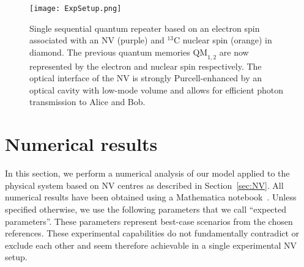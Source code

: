 \documentclass[aps,pra,reprint,superscriptaddress]{revtex4-1}
\begin{document}
\begin{figure}
	\centering
	\texttt{[image: ExpSetup.png]}
	\caption{\label{fig:ExpSetup} Single sequential quantum repeater based on an electron spin associated with an NV (purple) and $^{13}$C nuclear spin (orange) in diamond. The previous quantum memories $\mathrm{QM}_{1,2}$ are now represented by the electron and nuclear spin respectively. The optical interface of the NV is strongly Purcell-enhanced by an optical cavity with low-mode volume and allows for efficient photon transmission to Alice and Bob.}
\end{figure}




\section{Numerical results}
\label{sec:results}
In this section, we perform a numerical analysis of our model applied to the physical system based on NV centres as described in Section~\ref{sec:NV}. All numerical results have been obtained using a Mathematica notebook~\cite{Note1}.
Unless specified otherwise, we use the following parameters that we call ``expected parameters''. These parameters represent best-case scenarios from the chosen references. These experimental capabilities do not fundamentally contradict or exclude each other and seem therefore achievable in a single experimental NV setup. 
\end{document}
